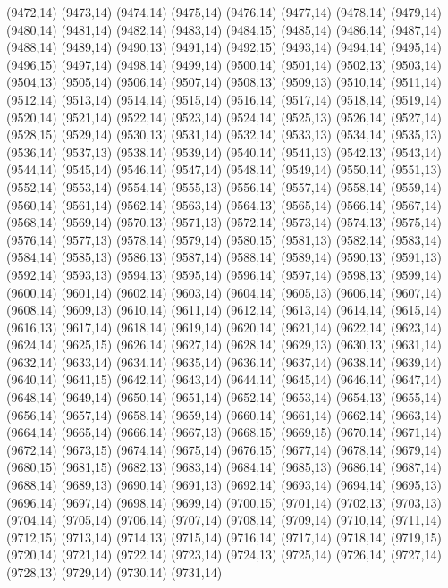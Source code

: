 (9472,14)
(9473,14)
(9474,14)
(9475,14)
(9476,14)
(9477,14)
(9478,14)
(9479,14)
(9480,14)
(9481,14)
(9482,14)
(9483,14)
(9484,15)
(9485,14)
(9486,14)
(9487,14)
(9488,14)
(9489,14)
(9490,13)
(9491,14)
(9492,15)
(9493,14)
(9494,14)
(9495,14)
(9496,15)
(9497,14)
(9498,14)
(9499,14)
(9500,14)
(9501,14)
(9502,13)
(9503,14)
(9504,13)
(9505,14)
(9506,14)
(9507,14)
(9508,13)
(9509,13)
(9510,14)
(9511,14)
(9512,14)
(9513,14)
(9514,14)
(9515,14)
(9516,14)
(9517,14)
(9518,14)
(9519,14)
(9520,14)
(9521,14)
(9522,14)
(9523,14)
(9524,14)
(9525,13)
(9526,14)
(9527,14)
(9528,15)
(9529,14)
(9530,13)
(9531,14)
(9532,14)
(9533,13)
(9534,14)
(9535,13)
(9536,14)
(9537,13)
(9538,14)
(9539,14)
(9540,14)
(9541,13)
(9542,13)
(9543,14)
(9544,14)
(9545,14)
(9546,14)
(9547,14)
(9548,14)
(9549,14)
(9550,14)
(9551,13)
(9552,14)
(9553,14)
(9554,14)
(9555,13)
(9556,14)
(9557,14)
(9558,14)
(9559,14)
(9560,14)
(9561,14)
(9562,14)
(9563,14)
(9564,13)
(9565,14)
(9566,14)
(9567,14)
(9568,14)
(9569,14)
(9570,13)
(9571,13)
(9572,14)
(9573,14)
(9574,13)
(9575,14)
(9576,14)
(9577,13)
(9578,14)
(9579,14)
(9580,15)
(9581,13)
(9582,14)
(9583,14)
(9584,14)
(9585,13)
(9586,13)
(9587,14)
(9588,14)
(9589,14)
(9590,13)
(9591,13)
(9592,14)
(9593,13)
(9594,13)
(9595,14)
(9596,14)
(9597,14)
(9598,13)
(9599,14)
(9600,14)
(9601,14)
(9602,14)
(9603,14)
(9604,14)
(9605,13)
(9606,14)
(9607,14)
(9608,14)
(9609,13)
(9610,14)
(9611,14)
(9612,14)
(9613,14)
(9614,14)
(9615,14)
(9616,13)
(9617,14)
(9618,14)
(9619,14)
(9620,14)
(9621,14)
(9622,14)
(9623,14)
(9624,14)
(9625,15)
(9626,14)
(9627,14)
(9628,14)
(9629,13)
(9630,13)
(9631,14)
(9632,14)
(9633,14)
(9634,14)
(9635,14)
(9636,14)
(9637,14)
(9638,14)
(9639,14)
(9640,14)
(9641,15)
(9642,14)
(9643,14)
(9644,14)
(9645,14)
(9646,14)
(9647,14)
(9648,14)
(9649,14)
(9650,14)
(9651,14)
(9652,14)
(9653,14)
(9654,13)
(9655,14)
(9656,14)
(9657,14)
(9658,14)
(9659,14)
(9660,14)
(9661,14)
(9662,14)
(9663,14)
(9664,14)
(9665,14)
(9666,14)
(9667,13)
(9668,15)
(9669,15)
(9670,14)
(9671,14)
(9672,14)
(9673,15)
(9674,14)
(9675,14)
(9676,15)
(9677,14)
(9678,14)
(9679,14)
(9680,15)
(9681,15)
(9682,13)
(9683,14)
(9684,14)
(9685,13)
(9686,14)
(9687,14)
(9688,14)
(9689,13)
(9690,14)
(9691,13)
(9692,14)
(9693,14)
(9694,14)
(9695,13)
(9696,14)
(9697,14)
(9698,14)
(9699,14)
(9700,15)
(9701,14)
(9702,13)
(9703,13)
(9704,14)
(9705,14)
(9706,14)
(9707,14)
(9708,14)
(9709,14)
(9710,14)
(9711,14)
(9712,15)
(9713,14)
(9714,13)
(9715,14)
(9716,14)
(9717,14)
(9718,14)
(9719,15)
(9720,14)
(9721,14)
(9722,14)
(9723,14)
(9724,13)
(9725,14)
(9726,14)
(9727,14)
(9728,13)
(9729,14)
(9730,14)
(9731,14)
